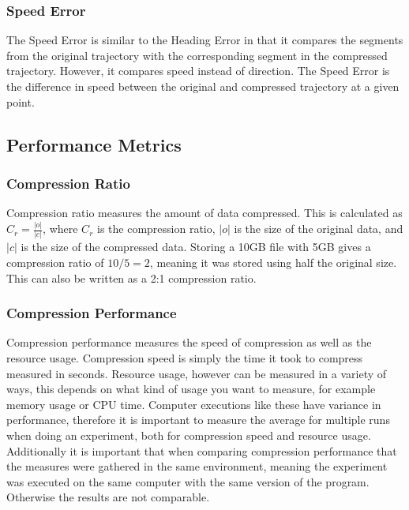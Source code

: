 \subsubsection{Speed Error}
The Speed Error is similar to the Heading Error in that it compares the segments from the original trajectory with the corresponding segment in the compressed trajectory. However, it compares speed instead of direction. The Speed Error is the difference in speed between the original and compressed trajectory at a given point.

\subsection{Performance Metrics}
\subsubsection{Compression Ratio}
Compression ratio measures the amount of data compressed. This is calculated as $C_{r} = \frac{|o|}{|c|}$, where $C_{r}$ is the compression ratio, $|o|$ is the size of the original data, and $|c|$ is the size of the compressed data. Storing a 10GB file with 5GB gives a compression ratio of $10 / 5 = 2$, meaning it was stored using half the original size. This can also be written as a 2:1 compression ratio.

\subsubsection{Compression Performance}
Compression performance measures the speed of compression as well as the resource usage. Compression speed is simply the time it took to compress measured in seconds. Resource usage, however can be measured in a variety of ways, this depends on what kind of usage you want to measure, for example memory usage or CPU time. Computer executions like these have variance in performance, therefore it is important to measure the average for multiple runs when doing an experiment, both for compression speed and resource usage. Additionally it is important that when comparing compression performance that the measures were gathered in the same environment, meaning the experiment was executed on the same computer with the same version of the program. Otherwise the results are not comparable.

